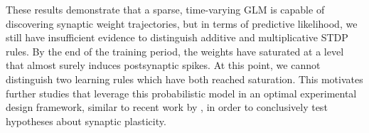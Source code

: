 These results demonstrate that a sparse, time-varying GLM is capable of discovering synaptic weight trajectories, but in terms of predictive likelihood, we still have insufficient evidence to distinguish additive and multiplicative STDP rules.  
By the end of the training period, the weights have saturated at a level that almost surely induces postsynaptic spikes. At this point, we cannot distinguish two learning rules which have both reached saturation. 
This motivates further studies that leverage this probabilistic model in an optimal experimental design framework, similar to recent work by  \citet{Shababo-2013}, in order to conclusively test hypotheses about synaptic plasticity.

\begin{figure}[t]
  \centering
  \vspace{-0.5em}

\end{figure}
